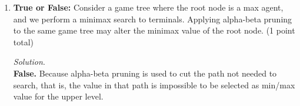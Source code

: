 \documentclass[10pt]{article}
\begin{document}
\begin{enumerate}
\begin{enumerate}
\begin{mdframed}[leftmargin=-6.5mm]
        \end{mdframed}
    \end{enumerate}
    \item \textbf{True or False: }Consider a game tree where the root node is a max agent, and we perform a minimax search to terminals. Applying alpha-beta pruning to the same game tree may alter the minimax value of the root node. (1 point total)
    \begin{mdframed}[leftmargin=-6.5mm]
    \textit{Solution}.\\
    \textbf{False. }Because alpha-beta pruning is used to cut the path not needed to search, that is, the value in that path is impossible to be selected as min/max value for the upper level.
    \end{mdframed}
\end{enumerate}
\end{document}
